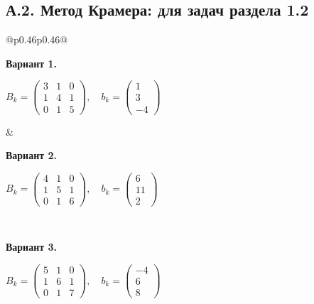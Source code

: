 \documentclass[12pt,a4paper]{article}
\begin{document}
\subsection*{А.2. Метод Крамера: для задач раздела 1.2}
{\small
\begin{longtable}{@{}p{0.46\textwidth}p{0.46\textwidth}@{}}
\begin{minipage}[t]{\linewidth}\vspace{0pt}\raggedright\setlength{\parskip}{0pt}
\textbf{Вариант 1.}\par\smallskip
\(\displaystyle B_k=\begin{pmatrix}3&1&0\\1&4&1\\0&1&5\end{pmatrix},\quad b_k=\begin{pmatrix}1\\3\\-4\end{pmatrix}\)\par
\end{minipage} &
\begin{minipage}[t]{\linewidth}\vspace{0pt}\raggedright\setlength{\parskip}{0pt}
\textbf{Вариант 2.}\par\smallskip
\(\displaystyle B_k=\begin{pmatrix}4&1&0\\1&5&1\\0&1&6\end{pmatrix},\quad b_k=\begin{pmatrix}6\\11\\2\end{pmatrix}\)\par
\end{minipage}\\\noalign{\vskip 14pt}
\begin{minipage}[t]{\linewidth}\vspace{0pt}\raggedright\setlength{\parskip}{0pt}
\textbf{Вариант 3.}\par\smallskip
\(\displaystyle B_k=\begin{pmatrix}5&1&0\\1&6&1\\0&1&7\end{pmatrix},\quad b_k=\begin{pmatrix}-4\\6\\8\end{pmatrix}\)\par

\end{minipage}
\end{longtable}}
\end{document}
